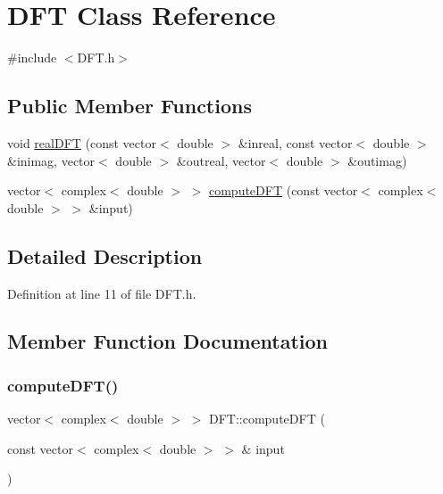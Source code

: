 \hypertarget{class_d_f_t}{}\section{D\+FT Class Reference}
\label{class_d_f_t}


{\ttfamily \#include $<$D\+F\+T.\+h$>$}

\subsection*{Public Member Functions}
\begin{DoxyCompactItemize}
\item 
void \mbox{\hyperlink{class_d_f_t_a92567785c575cc75dc6600bcfc6acbea}{real\+D\+FT}} (const vector$<$ double $>$ \&inreal, const vector$<$ double $>$ \&inimag, vector$<$ double $>$ \&outreal, vector$<$ double $>$ \&outimag)
\item 
vector$<$ complex$<$ double $>$ $>$ \mbox{\hyperlink{class_d_f_t_a4cf25344c21c7f521a67108dab346464}{compute\+D\+FT}} (const vector$<$ complex$<$ double $>$ $>$ \&input)
\end{DoxyCompactItemize}


\subsection{Detailed Description}


Definition at line 11 of file D\+F\+T.\+h.



\subsection{Member Function Documentation}
\mbox{\label{class_d_f_t_a4cf25344c21c7f521a67108dab346464}} 
\subsubsection{\texorpdfstring{compute\+D\+F\+T()}{computeDFT()}}
{\footnotesize\ttfamily vector$<$ complex$<$ double $>$ $>$ D\+F\+T\+::compute\+D\+FT (\begin{DoxyParamCaption}\item[{const vector$<$ complex$<$ double $>$ $>$ \&}]{input }\end{DoxyParamCaption})}



